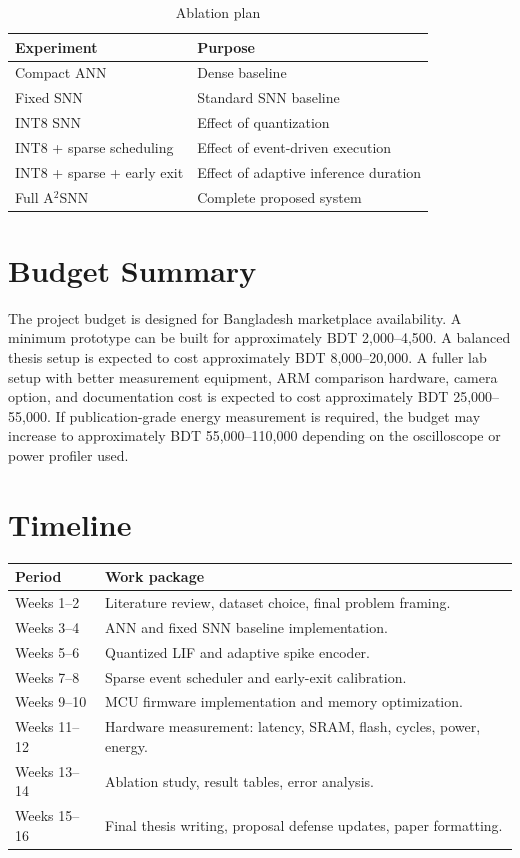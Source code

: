 \documentclass[12pt]{article}
\newcommand{\modelname}{A$^2$SNN}
\begin{document}
\begin{table}[h]
\centering
\caption{Ablation plan}
\begin{tabular}{ll}
\toprule
Experiment & Purpose \\
\midrule
Compact ANN & Dense baseline \\
Fixed SNN & Standard SNN baseline \\
INT8 SNN & Effect of quantization \\
INT8 + sparse scheduling & Effect of event-driven execution \\
INT8 + sparse + early exit & Effect of adaptive inference duration \\
Full \modelname & Complete proposed system \\
\bottomrule
\end{tabular}
\end{table}

\section{Budget Summary}
The project budget is designed for Bangladesh marketplace availability. A minimum prototype can be built for approximately BDT 2,000--4,500. A balanced thesis setup is expected to cost approximately BDT 8,000--20,000. A fuller lab setup with better measurement equipment, ARM comparison hardware, camera option, and documentation cost is expected to cost approximately BDT 25,000--55,000. If publication-grade energy measurement is required, the budget may increase to approximately BDT 55,000--110,000 depending on the oscilloscope or power profiler used.

\section{Timeline}
\begin{tabular}{p{3cm}p{11cm}}
\toprule
Period & Work package \\
\midrule
Weeks 1--2 & Literature review, dataset choice, final problem framing. \\
Weeks 3--4 & ANN and fixed SNN baseline implementation. \\
Weeks 5--6 & Quantized LIF and adaptive spike encoder. \\
Weeks 7--8 & Sparse event scheduler and early-exit calibration. \\
Weeks 9--10 & MCU firmware implementation and memory optimization. \\
Weeks 11--12 & Hardware measurement: latency, SRAM, flash, cycles, power, energy. \\
Weeks 13--14 & Ablation study, result tables, error analysis. \\
Weeks 15--16 & Final thesis writing, proposal defense updates, paper formatting. \\
\bottomrule
\end{tabular}
\end{document}
